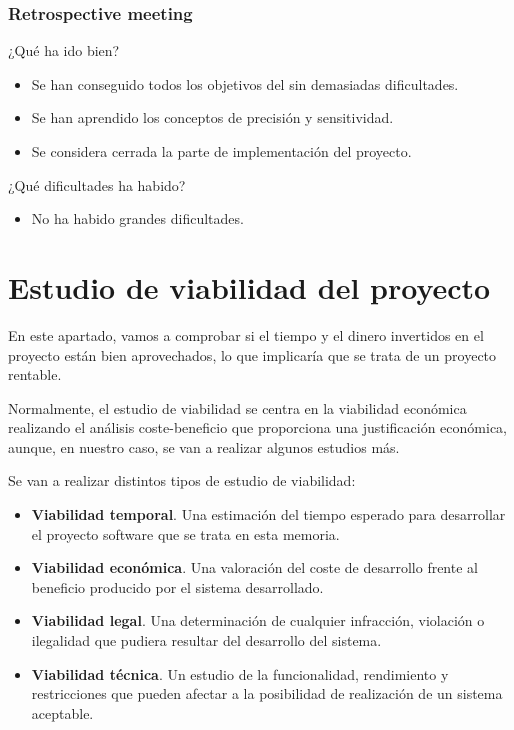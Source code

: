 

\subsubsection*{Retrospective meeting}
¿Qué ha ido bien?
\begin{itemize}
 \item Se han conseguido todos los objetivos del \sprint{} sin demasiadas dificultades.
 \item Se han aprendido los conceptos de precisión y sensitividad.
 \item Se considera cerrada la parte de implementación del proyecto.
\end{itemize}

¿Qué dificultades ha habido?
\begin{itemize}
 \item No ha habido grandes dificultades.
\end{itemize}

\newpage

\newcommand{\pesoscasosdeuso}{\operatorname{Peso De Casos De Uso}}
\newcommand{\pesosactores}{\operatorname{Peso De Actores}}

\section{Estudio de viabilidad del proyecto}
En este apartado, vamos a comprobar si el tiempo y el dinero invertidos en el proyecto están bien aprovechados, lo que implicaría que se trata de un proyecto rentable.

Normalmente, el estudio de viabilidad se centra en la viabilidad económica realizando el análisis coste-beneficio que proporciona una justificación económica, aunque, en nuestro caso, se van a realizar algunos estudios más.

Se van a realizar distintos tipos de estudio de viabilidad:

\begin{itemize}
\item \textbf{Viabilidad temporal}. Una estimación del tiempo esperado para desarrollar el proyecto software que se trata en esta memoria.
\item \textbf{Viabilidad económica}. Una valoración del coste de desarrollo frente al beneficio producido por el sistema desarrollado.
\item \textbf{Viabilidad legal}. Una determinación de cualquier infracción, violación o ilegalidad que pudiera resultar del desarrollo del sistema.
\item \textbf{Viabilidad técnica}. Un estudio de la funcionalidad, rendimiento y restricciones que pueden afectar a la posibilidad de realización de un sistema aceptable.
\end{itemize}
 
